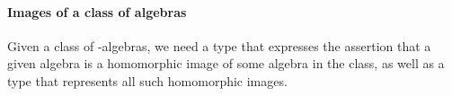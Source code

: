 \paragraph{Images of a class of
algebras}\label{images-of-a-class-of-algebras}

Given a class  of -algebras, we need a type that
expresses the assertion that a given algebra is a homomorphic image of
some algebra in the class, as well as a type that represents all such
homomorphic images.
\ccpad
\begin{code}%
\>[0]\AgdaSpace{}%
\AgdaModule{\AgdaUnderscore{}}\AgdaSpace{}%
\AgdaSymbol{\{}\AgdaSpace{}%
\AgdaSymbol{:}\AgdaSpace{}%
\AgdaSymbol{\}}\AgdaSpace{}%
\<%
\\
%
\\[\AgdaEmptyExtraSkip]%
\>[0][@{}l@{\AgdaIndent{0}}]%
\>[1]\AgdaSpace{}%
\AgdaSymbol{:}\AgdaSpace{}%
\AgdaSpace{}%
\AgdaSpace{}%
\AgdaSpace{}%
\AgdaSpace{}%
\AgdaSpace{}%
\AgdaSymbol{(}\AgdaSpace{}%
\AgdaSpace{}%
\AgdaSymbol{)(}\AgdaSpace{}%
\AgdaSymbol{)}\AgdaSpace{}%
\AgdaSpace{}%
\AgdaSpace{}%
\AgdaSpace{}%
\AgdaSpace{}%
\AgdaSpace{}%
\AgdaSpace{}%
\AgdaSpace{}%
\<%
\\
%
\>[1]\AgdaSpace{}%
\AgdaSpace{}%
\AgdaSpace{}%
\AgdaSymbol{=}\AgdaSpace{}%
\AgdaSpace{}%
\AgdaSpace{}%
\AgdaSpace{}%
\AgdaSymbol{(}\AgdaSpace{}%
\AgdaSpace{}%
\AgdaSymbol{)}\AgdaSpace{}%
\AgdaFunction{,}\AgdaSpace{}%
\AgdaSymbol{(}\AgdaSpace{}%
\AgdaSpace{}%
\AgdaSymbol{)}\AgdaSpace{}%
\AgdaSpace{}%
\AgdaSymbol{(}\AgdaSpace{}%
\AgdaSpace{}%
\AgdaSymbol{)}\<%
\\
%
\\[\AgdaEmptyExtraSkip]%
%
\>[1]\AgdaSpace{}%
\AgdaSymbol{:}\AgdaSpace{}%

\end{code}
